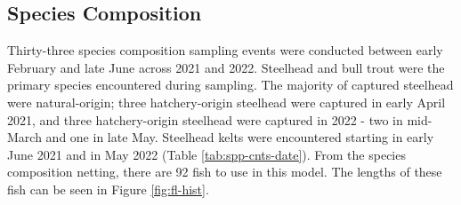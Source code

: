 \documentclass[
]{article}
\begin{document}
\FloatBarrier

\hypertarget{species-composition}{%
\subsection{Species Composition}\label{species-composition}}

Thirty-three species composition sampling events were conducted between early February and late June across 2021 and 2022. Steelhead and bull trout were the primary species encountered during sampling. The majority of captured steelhead were natural-origin; three hatchery-origin steelhead were captured in early April 2021, and three hatchery-origin steelhead were captured in 2022 - two in mid-March and one in late May. Steelhead kelts were encountered starting in early June 2021 and in May 2022 (Table \ref{tab:spp-cnts-date}). From the species composition netting, there are 92 fish to use in this model. The lengths of these fish can be seen in Figure \ref{fig:fl-hist}.
\end{document}
